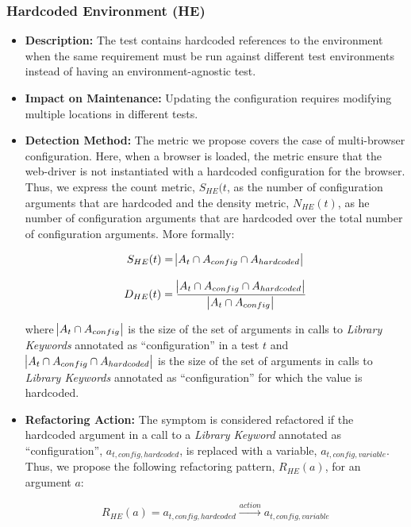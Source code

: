 \subsubsection{Hardcoded Environment (HE)}

\begin{itemize}
    \item \textbf{Description:} The test contains hardcoded references to the environment when the same requirement must be run against different test environments instead of having an environment-agnostic test.
    
    \item \textbf{Impact on Maintenance:} Updating the configuration requires modifying multiple locations in different tests.
    
    \item \textbf{Detection Method:} The metric we propose covers the case of multi-browser configuration. Here, when a browser is loaded, the metric ensure that the web-driver is not instantiated with a hardcoded configuration for the browser. Thus, we express the count metric, $S_{HE}(t$, as the number of configuration arguments that are hardcoded and the density metric, $N_{HE}(t)$, as he number of configuration arguments that are hardcoded over the total number of configuration arguments. More formally:

    \begin{equation*}
        S_{HE}(t) = \abs{A_{t} \cap A_{config} \cap A_{hardcoded}}
    \end{equation*}
    
    \begin{equation*}
        D_{HE}(t) = \frac{\abs{A_{t} \cap A_{config} \cap A_{hardcoded}}}{\abs{A_{t} \cap A_{config}}}
    \end{equation*}
    
    where $\abs{A_{t} \cap A_{config}}$ is the size of the set of arguments in calls to \emph{Library Keywords} annotated as ``configuration'' in a test $t$ and $\abs{A_{t} \cap A_{config} \cap A_{hardcoded}}$ is the size of the set of arguments in calls to \emph{Library Keywords} annotated as ``configuration'' for which the value is hardcoded.
    
    \item \textbf{Refactoring Action:} The symptom is considered refactored if the hardcoded argument in a call to a \emph{Library Keyword} annotated as ``configuration'', $a_{t, config, hardcoded}$, is replaced with a variable, $a_{t, config, variable}$. Thus, we propose the following refactoring pattern, $R_{HE}(a)$, for an argument $a$:

    \begin{equation*}
        R_{HE}(a) = a_{t, config, hardcoded} \xrightarrow{action}  a_{t, config, variable}
    \end{equation*}
\end{itemize}

